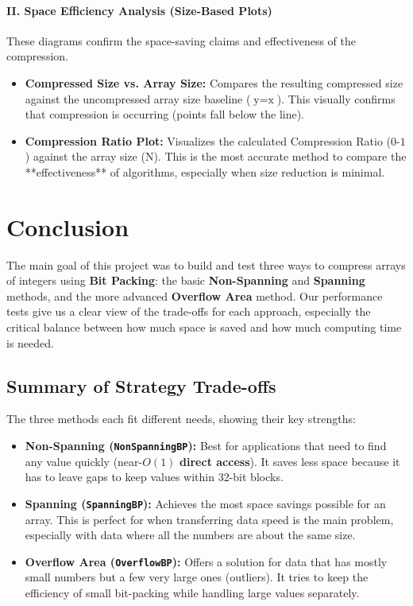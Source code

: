 \documentclass[11pt, a4paper]{article}
\begin{document}
	\paragraph{II. Space Efficiency Analysis (Size-Based Plots)}
	These diagrams confirm the space-saving claims and effectiveness of the compression.
	
	\begin{itemize}
		\item \textbf{Compressed Size vs. Array Size:} Compares the resulting compressed size against the uncompressed array size baseline ($\text{y} = \text{x}$). This visually confirms that compression is occurring (points fall below the line).
		
		\item \textbf{Compression Ratio Plot:} Visualizes the calculated Compression Ratio ($\text{0-1}$) against the array size ($\text{N}$). This is the most accurate method to compare the **effectiveness** of algorithms, especially when size reduction is minimal.
	\end{itemize}
	
	\section{Conclusion}
	
	The main goal of this project was to build and test three ways to compress arrays of integers using \textbf{Bit Packing}: the basic \textbf{Non-Spanning} and \textbf{Spanning} methods, and the more advanced \textbf{Overflow Area} method. Our performance tests give us a clear view of the trade-offs for each approach, especially the critical balance between how much space is saved and how much computing time is needed.
	
	\subsection{Summary of Strategy Trade-offs}
	
	The three methods each fit different needs, showing their key strengths:
	
	\begin{itemize}
		\item \textbf{Non-Spanning (\texttt{NonSpanningBP}):} Best for applications that need to find any value quickly (near-$O(1)$ \textbf{direct access}). It saves less space because it has to leave gaps to keep values within 32-bit blocks.
		\item \textbf{Spanning (\texttt{SpanningBP}):} Achieves the most space savings possible for an array. This is perfect for when transferring data speed is the main problem, especially with data where all the numbers are about the same size.
	\item \textbf{Overflow Area (\texttt{OverflowBP}):} Offers a solution for data that has mostly small numbers but a few very large ones (outliers). It tries to keep the efficiency of small bit-packing while handling large values separately.
	\end{itemize}
	
\end{document}
